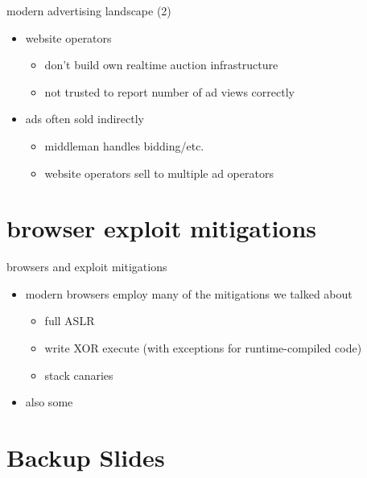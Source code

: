 \begin{frame}{modern advertising landscape (2)}
    \begin{itemize}
        \item website operators 
            \begin{itemize}
            \item don't build own realtime auction infrastructure
            \item not trusted to report number of ad views correctly
            \end{itemize}
        \item ads often sold indirectly
            \begin{itemize}
            \item middleman handles bidding/etc.
            \item website operators sell to multiple ad operators
            \end{itemize}
    \end{itemize}
\end{frame}

\section{browser exploit mitigations}

\begin{frame}{browsers and exploit mitigations}
    \begin{itemize}
    \item modern browsers employ many of the mitigations we talked about
        \begin{itemize}
        \item full ASLR
        \item write XOR execute (with exceptions for runtime-compiled code)
        \item stack canaries
        \end{itemize}
    \item also some 
    \end{itemize}
\end{frame}

\section{Backup Slides}

